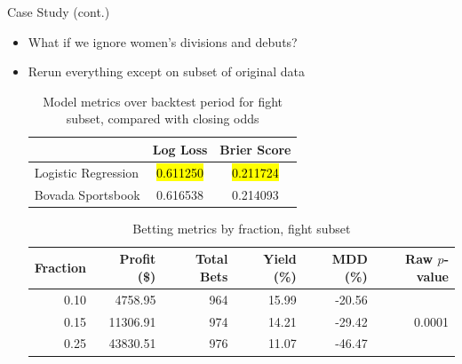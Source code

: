 \documentclass[aspectratio=169,xcolor=dvipsnames]{beamer}
\begin{document}
\begin{frame}{Case Study (cont.)}
    \begin{itemize}
        \item What if we ignore women's divisions and debuts?
        \item Rerun everything except on subset of original data

        \scriptsize
        \begin{table}[!htb]
        \centering
        \begin{tabular}{@{}lcc@{}}
        \toprule
                            & Log Loss & Brier Score \\ \midrule
        Logistic Regression & \hl{0.611250} & \hl{0.211724}    \\
        Bovada Sportsbook   & 0.616538 & 0.214093    \\ \bottomrule
        \end{tabular}
        \normalsize
        \caption{Model metrics over backtest period for fight subset, compared with closing odds}
        \end{table}

        \scriptsize
        \begin{table}[!htb]
        \centering
        \begin{tabular}{rrrrrr} 
        \toprule
        Fraction & Profit (\$) & Total Bets & Yield (\%) & MDD (\%) & Raw $p$-value            \\ 
        \toprule
        0.10     & 4758.95     & 964        & 15.99      & -20.56   & \multirow{3}{*}{0.0001}  \\
        0.15     & 11306.91    & 974        & 14.21      & -29.42   &                          \\
        0.25     & 43830.51    & 976        & 11.07      & -46.47   &                          \\
        \bottomrule
        \end{tabular}
        \normalsize
        \caption{Betting metrics by fraction, fight subset}
        \end{table}
    \end{itemize}
\end{frame}

\end{document}
